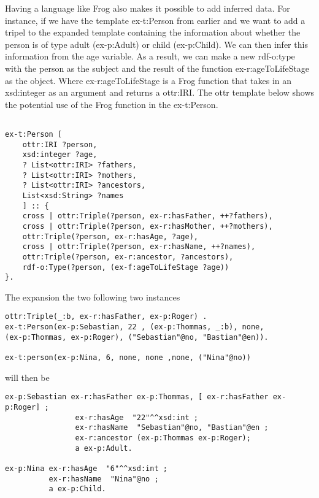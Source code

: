 \para
Having a language like Frog also makes it possible to add inferred data. For instance, if we have the template ex-t:Person from earlier and we want to add a tripel to the expanded template containing the information about whether the person is of type adult (ex-p:Adult) or child (ex-p:Child). We can then infer this information from the age variable. As a result, we can make a new rdf-o:type with the person as the subject and the result of the function ex-r:ageToLifeStage as the object. Where ex-r:ageToLifeStage is a Frog function that takes in an xsd:integer as an argument and returns a ottr:IRI. The ottr template below shows the potential use of the Frog function in the ex-t:Person.

\begin{lstlisting}[frame=single]
    
ex-t:Person [
    ottr:IRI ?person,
    xsd:integer ?age,
    ? List<ottr:IRI> ?fathers,
    ? List<ottr:IRI> ?mothers,
    ? List<ottr:IRI> ?ancestors,
    List<xsd:String> ?names
    ] :: {
    cross | ottr:Triple(?person, ex-r:hasFather, ++?fathers),
    cross | ottr:Triple(?person, ex-r:hasMother, ++?mothers),
    ottr:Triple(?person, ex-r:hasAge, ?age),
    cross | ottr:Triple(?person, ex-r:hasName, ++?names),
    ottr:Triple(?person, ex-r:ancestor, ?ancestors),
    rdf-o:Type(?person, (ex-f:ageToLifeStage ?age))
}.
\end{lstlisting}

The expansion the two following two instances

\begin{lstlisting}[frame=single]
ottr:Triple(_:b, ex-r:hasFather, ex-p:Roger) .
ex-t:Person(ex-p:Sebastian, 22 , (ex-p:Thommas, _:b), none, 
(ex-p:Thommas, ex-p:Roger), ("Sebastian"@no, "Bastian"@en)).

ex-t:person(ex-p:Nina, 6, none, none ,none, ("Nina"@no))
\end{lstlisting}

will then be
\begin{lstlisting}[frame=single, language=turtle]
ex-p:Sebastian ex-r:hasFather ex-p:Thommas, [ ex-r:hasFather ex-p:Roger] ; 
                ex-r:hasAge  "22"^^xsd:int ; 
                ex-r:hasName  "Sebastian"@no, "Bastian"@en ;
                ex-r:ancestor (ex-p:Thommas ex-p:Roger);
                a ex-p:Adult.

ex-p:Nina ex-r:hasAge  "6"^^xsd:int ; 
          ex-r:hasName  "Nina"@no ;
          a ex-p:Child.
\end{lstlisting}

